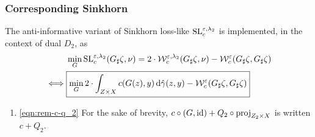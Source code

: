 \documentclass[11pt,a4paper]{article}
\begin{document}
\subsubsection{Corresponding Sinkhorn}

The anti-informative variant of Sinkhorn loss-like $\mathrm{SL}_{c}^{\varepsilon, \lambda_2}$ is implemented, in the context of dual $D_2$, as
\begin{align}
    &\min_{G} \SLace(\pf{G}{\zeta}, \nu) = 2 \cdot \Wace(\pf{G}{\zeta}, \nu) - \Wce(\pf{G}{\zeta}, \pf{G}{\zeta}) \\%
    \iff &\boxed{\min_{G} 2 \cdot \int_{\ZX}c(G(z), y) \d \gammah(z, y) - \Wce(\pf{G}{\zeta}, \pf{G}{\zeta})}
\end{align}

\begin{rems}
    \begin{enumerate}
        \item \eqref{eqn:rem-c-q_2} For the sake of brevity, $c \circ (G, \text{\rmfamily id}) + Q_2 \circ {{\mathrm{proj}}_{Z_2\times X}}$ is written $c + Q_2$.
    \end{enumerate}
\end{rems}




\end{document}
